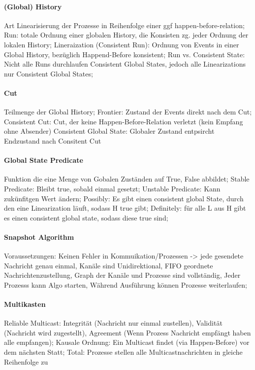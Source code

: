 \documentclass[pagesize,11pt,a4paper]{scrartcl}
\begin{document}
\paragraph*{(Global) History}
	Art Linearisierung der Prozesse in Reihenfolge einer ggf happen-before-relation;
	Run: totale Ordnung einer globalen History, die Konsisten zg. jeder Ordnung der lokalen History;
	Lineraization (Consistent Run): Ordnung von Events in einer Global History, bezüglich Happend-Before konsistent;
	Run vs. Consistent State: Nicht alle Runs durchlaufen Consistent Global States, jedoch alle Linearizations nur Consistent Global States;

\paragraph*{Cut}
	Teilmenge der Global History;
	Frontier: Zustand der Events direkt nach dem Cut;
	Consistent Cut: Cut, der keine Happen-Before-Relation verletzt (kein Empfang ohne Absender)
	Consistent Global State: Globaler Zustand entpsircht Endzustand nach Consitent Cut

\paragraph*{Global State Predicate}
	Funktion die eine Menge von Gobalen Zuständen auf True, False abbildet;
	Stable Predicate: Bleibt true, sobald einmal gesetzt;
	Unstable Predicate: Kann zukünfitgen Wert ändern;
	Possibly: Es gibt einen consistent global State, durch den eine Linearization läuft, sodass H true gibt;
	Definitely: für alle L aus H gibt es einen consistent global state, sodass diese true sind;
	
\paragraph*{Snapshot Algorithm}
	Voraussetzungen: Keinen Fehler in Kommuikation/Prozessen -> jede gesendete Nachricht genau einmal, Kanäle sind Unidirektional, FIFO geordnete Nachrichtenzustellung, Graph der Kanäle und Prozesse sind vollständig, Jeder Prozesss kann Algo starten, Während Ausführung können Prozesse weiterlaufen;

\paragraph*{Multikasten}
	Reliable Multicast: Integrität (Nachricht nur einmal zustellen), Validität (Nachricht wird zugestellt), Agreement (Wenn Prozess Nachricht empfängt haben alle empfangen);
	Kausale Ordnung: Ein Multicast findet (via Happen-Before) vor dem nächsten Statt;
	Total: Prozesse stellen alle Multicastnachrichten in gleiche Reihenfolge zu
\end{document}
